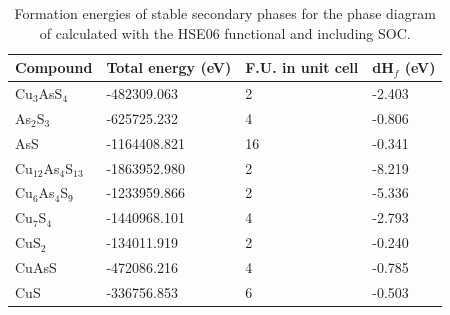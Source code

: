 \documentclass[11pt, twoside]{report}
\begin{document}
\begin{table}[]\label{enargite_elements}
\begin{tabular}{@{}llll@{}}
\toprule
Compound      & Total energy (eV) & F.U. in unit cell & dH$_f$ (eV)     \\ \midrule
Cu$_3$AsS$_4$ & -482309.063      & 2                 & -2.403 \\
As$_2$S$_3$         & -625725.232       & 4                 & -0.806 \\
AsS           & -1164408.821      & 16                & -0.341 \\ 
Cu$_{12}$As$_4$S$_{13}$    & -1863952.980       & 2                 & -8.219 \\
Cu$_6$As$_4$S$_9$      & -1233959.866      & 2                 & -5.336 \\
Cu$_7$S$_4$         & -1440968.101      & 4                 & -2.793   \\
CuS$_2$          & -134011.919      & 2                 & -0.240 \\
CuAsS         & -472086.216      & 4                 & -0.785 \\
CuS           & -336756.853      & 6                 & -0.503 \\ \bottomrule
\end{tabular}
\caption{Formation energies of stable secondary phases for the phase diagram of {\enargite} calculated with the HSE06 functional and including SOC.}\label{enargite_stable}
\end{table}
\end{document}
